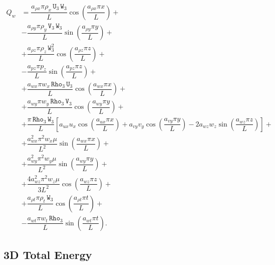 \documentclass[10pt]{article}
\newcommand{\Rho}{\,\mathtt{Rho}}
\newcommand{\U}{\,\mathtt{U}}
\newcommand{\V}{\,\mathtt{V}}
\newcommand{\W}{\,\mathtt{W}}
\begin{document}
\begin{equation}
 \begin{split}
Q_w &= \dfrac{a_{\rho x} \pi \rho_x \U_3 \W_3}{L} \cos\left(\dfrac{a_{\rho x} \pi x}{L}\right)+\\
&-\dfrac{a_{\rho y} \pi \rho_y \V_3 \W_3 }{L}\sin\left(\dfrac{a_{\rho y} \pi y}{L}\right)+\\
&+\dfrac{a_{\rho z} \pi \rho_z \W_3^2 }{L}\cos\left(\dfrac{a_{\rho z}\pi z }{L}\right)+\\
&-\dfrac{a_{pz} \pi p_z }{L}\sin\left(\dfrac{a_{pz}\pi z }{L}\right)+\\
&+\dfrac{a_{wx} \pi w_x \Rho_3 \U_3 }{L}\cos\left(\dfrac{a_{wx} \pi x}{L}\right)+\\
&+\dfrac{a_{wy} \pi w_y \Rho_3 \V_3}{L}\cos\left(\dfrac{a_{wy} \pi y}{L}\right) +\\
&+\dfrac{\pi \Rho_3 \W_3}{L}\left[a_{ux} u_x \cos\left(\dfrac{a_{ux} \pi x}{L}\right)+a_{vy} v_y \cos\left(\dfrac{a_{vy} \pi y}{L}\right)-2 a_{wz} w_z \sin\left(\dfrac{a_{wz}\pi z }{L}\right)\right]+\\
&+\dfrac{a_{wx}^2 \pi^2 w_x \mu }{L^2}\sin\left(\dfrac{a_{wx} \pi x}{L}\right) +\\
&+\dfrac{a_{wy}^2 \pi^2 w_y \mu }{L^2}\sin\left(\dfrac{a_{wy} \pi y}{L}\right) +\\
&+\dfrac{4 a_{wz}^2 \pi^2 w_z \mu }{3L^2}\cos\left(\dfrac{a_{wz} \pi z}{L}\right) +\\
&+\dfrac{a_{\rho t} \pi \rho_t \W_3 }{L}\cos\left(\dfrac{a_{\rho t} \pi t}{L}\right)+\\
&-\dfrac{a_{wt} \pi w_t  \Rho_3 }{L}\sin\left(\dfrac{a_{wt} \pi t}{L}\right).
 \end{split}
\end{equation}

\subsection{3D Total Energy}
\end{document}
